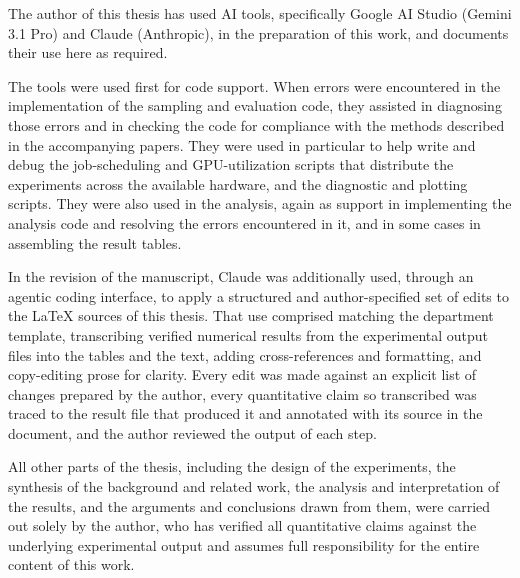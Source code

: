 The author of this thesis has used AI tools, specifically Google AI Studio (Gemini 3.1 Pro) and Claude (Anthropic), in the preparation of this work, and documents their use here as required.

The tools were used first for code support. When errors were encountered in the implementation of the sampling and evaluation code, they assisted in diagnosing those errors and in checking the code for compliance with the methods described in the accompanying papers. They were used in particular to help write and debug the job-scheduling and GPU-utilization scripts that distribute the experiments across the available hardware, and the diagnostic and plotting scripts. They were also used in the analysis, again as support in implementing the analysis code and resolving the errors encountered in it, and in some cases in assembling the result tables.

In the revision of the manuscript, Claude was additionally used, through an agentic coding interface, to apply a structured and author-specified set of edits to the LaTeX sources of this thesis. That use comprised matching the department template, transcribing verified numerical results from the experimental output files into the tables and the text, adding cross-references and formatting, and copy-editing prose for clarity. Every edit was made against an explicit list of changes prepared by the author, every quantitative claim so transcribed was traced to the result file that produced it and annotated with its source in the document, and the author reviewed the output of each step.

All other parts of the thesis, including the design of the experiments, the synthesis of the background and related work, the analysis and interpretation of the results, and the arguments and conclusions drawn from them, were carried out solely by the author, who has verified all quantitative claims against the underlying experimental output and assumes full responsibility for the entire content of this work.

